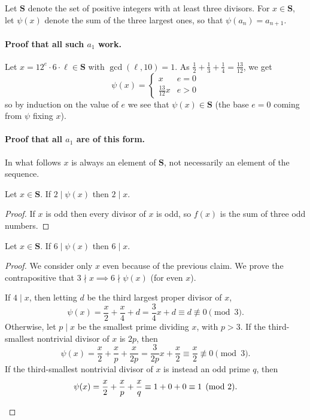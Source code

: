 \documentclass[11pt]{scrartcl}
\begin{document}
Let $\mathbf{S}$ denote the set of positive integers with at least three divisors.
For $x \in \mathbf{S}$, let $\psi(x)$ denote the sum of the three largest ones,
so that $\psi(a_n) = a_{n+1}$.

\paragraph{Proof that all such $a_1$ work.}
Let $x = 12^e \cdot 6 \cdot \ell \in \mathbf{S}$ with $\gcd(\ell, 10) = 1$.
As $\frac12+\frac13+\frac14 = \frac{13}{12}$, we get
\[ \psi(x) = \begin{cases}
    x & e = 0 \\
    \frac{13}{12} x & e > 0
  \end{cases} \]
so by induction on the value of $e$ we see that $\psi(x) \in \mathbf{S}$
(the base $e=0$ coming from $\psi$ fixing $x$).

\paragraph{Proof that all $a_1$ are of this form.}
In what follows $x$ is always an element of $\mathbf{S}$,
not necessarily an element of the sequence.

\begin{claim*}
  Let $x \in \mathbf{S}$. If $2 \mid \psi(x)$ then $2 \mid x$.
\end{claim*}
\begin{proof}
  If $x$ is odd then every divisor of $x$ is odd,
  so $f(x)$ is the sum of three odd numbers.
\end{proof}

\begin{claim*}
  Let $x \in \mathbf{S}$.  If $6 \mid \psi(x)$ then $6 \mid x$.
\end{claim*}
\begin{proof}
  We consider only $x$ even because of the previous claim.
  We prove the contrapositive that $3 \nmid x \implies 6 \nmid \psi(x)$ (for even $x$).
  \begin{itemize}
    \ii If $4 \mid x$, then letting $d$ be the third largest proper divisor of $x$,
    \[ \psi(x) = \frac x2 + \frac x4 + d = \frac 34 x + d \equiv d \not\equiv 0 \pmod 3. \]
    \ii Otherwise, let $p \mid x$ be the smallest prime dividing $x$, with $p > 3$.
    If the third-smallest nontrivial divisor of $x$ is $2p$, then
    \[ \psi(x) = \frac x2 + \frac xp + \frac{x}{2p} = \frac{3}{2p} x + \frac x2
      \equiv \frac x2 \not\equiv 0 \pmod 3. \]
    If the third-smallest nontrivial divisor of $x$ is instead an odd prime $q$, then
    \[ \psi(x) = \frac x2 + \frac xp + \frac{x}{q} \equiv 1+0+0 \equiv 1 \pmod 2. \qedhere \]
  \end{itemize}
\end{proof}
\end{document}
